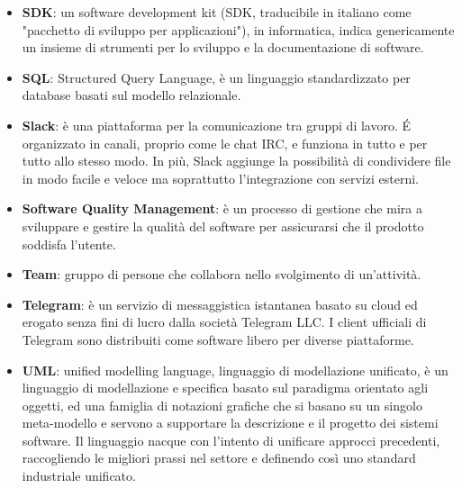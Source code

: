 \begin{itemize}
\item[] \textbf{SDK}: un software development kit (SDK, traducibile in italiano come "pacchetto di sviluppo per applicazioni"), in informatica, indica genericamente un insieme di strumenti per lo sviluppo e la documentazione di software.
\item[] \textbf{SQL}: Structured Query Language, è un linguaggio standardizzato per database basati sul modello relazionale.
\item[] \textbf{Slack}: è una piattaforma per la comunicazione tra gruppi di lavoro. \'E organizzato in canali, proprio come le chat IRC, e funziona in tutto e per tutto allo stesso modo. In più, Slack aggiunge la possibilità di condividere file in modo facile e veloce ma soprattutto l'integrazione con servizi esterni.
\item[] \textbf{Software Quality Management}: è un processo di gestione che mira a sviluppare e gestire la qualità del software per assicurarsi che il prodotto soddisfa l'utente.
\end{itemize}
\newpage

\begin{itemize}
\item[] \textbf{Team}: gruppo di persone che collabora nello svolgimento di un'attività.
\item[] \textbf{Telegram}: è un servizio di messaggistica istantanea basato su cloud ed erogato senza fini di lucro dalla società Telegram LLC. I client ufficiali di Telegram sono distribuiti come software libero per diverse piattaforme.
\end{itemize}
\newpage

\begin{itemize}
\item[] \textbf{UML}: unified modelling language, linguaggio di modellazione unificato, è un linguaggio di modellazione e specifica basato sul paradigma orientato agli oggetti, ed una famiglia di notazioni grafiche che si basano su un singolo meta-modello e servono a supportare la descrizione e il progetto dei sistemi software. Il linguaggio nacque con l'intento di unificare approcci precedenti, raccogliendo le migliori prassi nel settore e definendo così uno standard industriale unificato.
\end{itemize}
\newpage

